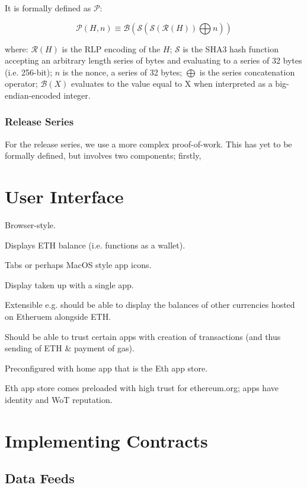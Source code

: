 \documentclass[9pt,oneside]{amsart}
\makeatletter
\newcommand*\eg{e.g.\@\xspace}
\makeatother
\begin{document}
\begin{multicols}{2}
It is formally defined as $\mathcal{P}$:

\begin{equation}
\mathcal{P}(H, n) \equiv \mathcal{B}(\mathcal{S}(\mathcal{S}(\mathcal{R}(H)) \bigoplus n))
\end{equation}

where:
$\mathcal{R}(H)$ is the RLP encoding of the $H$;
$\mathcal{S}$ is the SHA3 hash function accepting an arbitrary length series of bytes and evaluating to a series of 32 bytes (i.e. 256-bit);
$n$ is the nonce, a series of 32 bytes;
$\bigoplus$ is the series concatenation operator;
$\mathcal{B}(X)$ evaluates to the value equal to X when interpreted as a big-endian-encoded integer.

\subsubsection{Release Series}

For the release series, we use a more complex proof-of-work. This has yet to be formally defined, but involves two components; firstly, 

\section{User Interface}

Browser-style.

Displays ETH balance (i.e. functions as a wallet).

Tabs or perhaps MacOS style app icons.

Display taken up with a single app.

Extensible \eg should be able to display the balances of other currencies hosted on Etheruem alongside ETH.

Should be able to trust certain apps with creation of transactions (and thus sending of ETH \& payment of gas).

Preconfigured with home app that is the Eth app store.

Eth app store comes preloaded with high trust for ethereum.org; apps have identity and WoT reputation.

\section{Implementing Contracts}

\subsection{Data Feeds}


\end{multicols}
\end{document}
